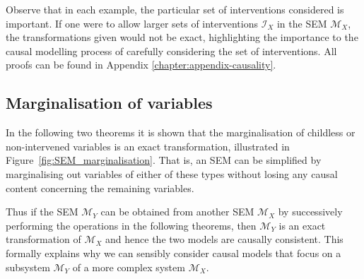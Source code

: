 Observe that in each example, the particular set of interventions considered is important. If one were to allow larger sets of interventions $\mathcal{I}_X$ in the SEM $\mathcal{M}_X$, the transformations given would not be exact, highlighting the importance to the causal modelling process of carefully considering the set of interventions. All proofs can be found in Appendix \ref{chapter:appendix-causality}.






\subsection{Marginalisation of variables}\label{sec:basic_trafos}

In the following two theorems it is shown that the marginalisation of childless or non-intervened variables is an exact transformation, illustrated in Figure~\ref{fig:SEM_marginalisation}.
That is, an SEM can be simplified by marginalising out variables of either of these types without losing any causal content concerning the remaining variables.

Thus if the SEM $\mathcal{M}_Y$ can be obtained from another SEM $\mathcal{M}_X$ by successively performing the operations in the following theorems, then $\mathcal{M}_Y$ is an exact transformation of $\mathcal{M}_X$ and hence the two models are causally consistent.
This formally explains why we can sensibly consider causal models that focus on a subsystem $\mathcal{M}_Y$ of a more complex system $\mathcal{M}_X$.

